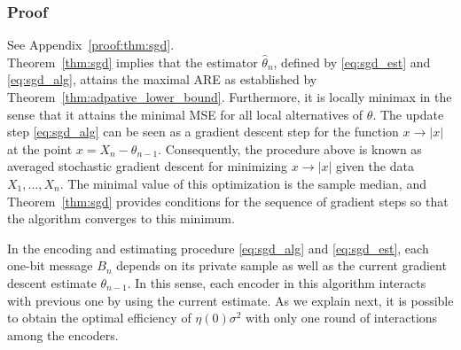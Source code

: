 \documentclass[letterpaper, 11pt]{IEEEtran}      %
\begin{document}
\subsubsection*{Proof}
See Appendix~\ref{proof:thm:sgd}. \\

Theorem~\ref{thm:sgd} implies that the estimator $\hat{\theta}_n$, defined by \eqref{eq:sgd_est} and \eqref{eq:sgd_alg}, attains the maximal ARE as established by Theorem~\ref{thm:adpative_lower_bound}. Furthermore, it is locally minimax in the sense that it attains the minimal MSE for all local alternatives of $\theta$. 
%
The update step \eqref{eq:sgd_alg} can be seen as a gradient descent step for the function $x\to |x|$ at the point $x=X_n - \theta_{n-1}$. Consequently, the procedure above is known as averaged stochastic gradient descent for minimizing $x \to |x|$ given the data $X_1,\ldots,X_n$. The minimal value of this optimization is the sample median, and Theorem~\ref{thm:sgd} provides conditions for the sequence of gradient steps so that the algorithm converges to this minimum. 
 \par
In the encoding and estimating procedure \eqref{eq:sgd_alg} and \eqref{eq:sgd_est}, each one-bit message $B_n$ depends on its private sample as well as the current gradient descent estimate $\theta_{n-1}$. In this sense, each encoder in this algorithm interacts with previous one by using the current estimate.
%
As we explain next, 
it is possible to obtain the optimal efficiency of $\eta(0)\sigma^2$ with only one round of interactions among the encoders. 
\end{document}
